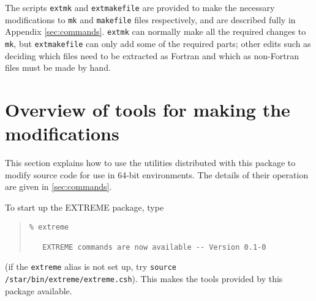 \documentclass[twoside,11pt]{article}
\newcommand{\htmlref}[2]{#1}
\renewcommand{\_}{\texttt{\symbol{95}}}
\newcommand{\xroutine}[1]{\htmlref{{\tt #1}}{#1}}
\newcommand{\file}[1]{{\tt #1}}
\newenvironment{squote}{\begin{quote}\begin{small}}{\end{small}\end{quote}}
\begin{document}
The scripts \xroutine{extmk} and \xroutine{extmakefile}
are provided to make the necessary
modifications to \file{mk} and \file{makefile} files respectively,
and are described fully in Appendix \ref{sec:commands}.
\xroutine{extmk} can normally make all the required changes to \file{mk},
but \xroutine{extmakefile} can only add some of the required parts;
other edits such as deciding which files need to be extracted as Fortran
and which as non-Fortran files must be made by hand.


\section{Overview of tools for making the modifications\label{sec:tools}}

This section explains how to use the utilities distributed with this package
to modify source code for use in 64-bit environments.
The details of their operation are given in \ref{sec:commands}.

To start up the EXTREME package, type
\begin{squote}
\begin{verbatim}
% extreme

   EXTREME commands are now available -- Version 0.1-0
\end{verbatim}
\end{squote}
(if the {\tt extreme} alias is not set up,
try {\tt source /star/bin/extreme/extreme.csh}).
This makes the tools provided by this package available.
\end{document}
